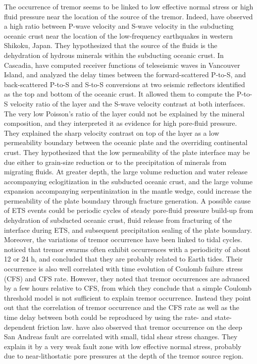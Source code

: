 \documentclass[draft]{agujournal2019}
\begin{document}
The occurrence of tremor seems to be linked to low effective normal stress or high fluid pressure near the location of the source of the tremor. Indeed,  have observed a high ratio between P-wave velocity and S-wave velocity in the subducting oceanic crust near the location of the low-frequency earthquakes in western Shikoku, Japan. They hypothesized that the source of the fluids is the dehydration of hydrous minerals within the subducting oceanic crust. In Cascadia,  have computed receiver functions of teleseismic waves in Vancouver Island, and analyzed the delay times between the forward-scattered P-to-S, and back-scattered P-to-S and S-to-S conversions at two seismic reflectors identified as the top and bottom of the oceanic crust. It allowed them to compute the P-to-S velocity ratio of the layer and the S-wave velocity contrast at both interfaces. The very low Poisson's ratio of the layer could not be explained by the mineral composition, and they interpreted it as evidence for high pore-fluid pressure. They explained the sharp velocity contrast on top of the layer as a low permeability boundary between the oceanic plate and the overriding continental crust. They hypothesized that the low permeability of the plate interface may be due either to grain-size reduction or to the precipitation of minerals from migrating fluids. At greater depth, the large volume reduction and water release accompanying eclogitization in the subducted oceanic crust, and the large volume expansion accompanying serpentinization in the mantle wedge, could increase the permeability of the plate boundary through fracture generation. A possible cause of ETS events could be periodic cycles of steady pore-fluid pressure build-up from dehydration of subducted oceanic crust, fluid release from fracturing of the interface during ETS, and subsequent precipitation sealing of the plate boundary. \\

Moreover, the variations of tremor occurrence have been linked to tidal cycles.  noticed that tremor swarms often exhibit occurrences with a periodicity of about 12 or 24 h, and concluded that they are probably related to Earth tides. Their occurrence is also well correlated with time evolution of Coulomb failure stress (CFS) and CFS rate. However, they noted that tremor occurrences are advanced by a few hours relative to CFS, from which they conclude that a simple Coulomb threshold model is not sufficient to explain tremor occurrence. Instead they point out that the correlation of tremor occurrence and the CFS rate as well as the time delay between both could be reproduced by using the rate- and state-dependent friction law.  have also observed that tremor occurrence on the deep San Andreas fault are correlated with small, tidal shear stress changes. They explain it by a very weak fault zone with low effective normal stress, probably due to near-lithostatic pore pressures at the depth of the tremor source region. \\
\end{document}
